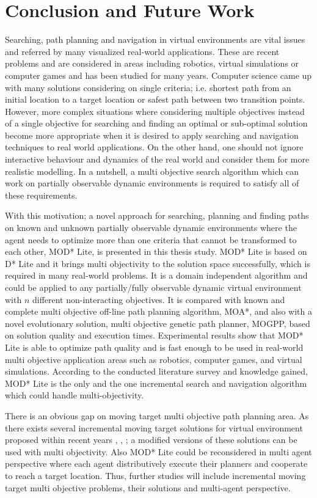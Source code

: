 \chapter{Conclusion and Future Work}
\label{chapter:conclusion}

Searching, path planning and navigation in virtual environments are vital issues and referred by many visualized real-world applications. These are recent problems and are considered in areas including robotics, virtual simulations or computer games and has been studied for many years. Computer science came up with many solutions considering on single criteria; i.e. shortest path from an initial location to a target location or safest path between two transition points. However, more complex situations where considering multiple objectives instead of a single objective for searching and finding an optimal or sub-optimal solution become more appropriate when it is desired to apply searching and navigation techniques to real world applications. On the other hand, one should not ignore interactive behaviour and dynamics of the real world and consider them for more realistic modelling. In a nutshell, a multi objective search algorithm which can work on partially observable dynamic environments is required to satisfy all of these requirements.

With this motivation; a novel approach for searching, planning and finding paths on known and unknown partially observable dynamic environments  where the agent needs to optimize more than one criteria that cannot be transformed to each other, MOD* Lite, is presented in this thesis study. MOD* Lite is based on D* Lite and it brings multi objectivity to the solution space successfully, which is required in many real-world problems. It is a domain independent algorithm and could be applied to any partially/fully observable dynamic virtual environment with $n$ different non-interacting objectives. It is compared with known and complete multi objective off-line path planning algorithm, MOA*, and also with a novel evolutionary solution, multi objective genetic path planner, MOGPP, based on solution quality and execution times. Experimental results show that MOD* Lite is able to optimize path quality and is fast enough to be used in real-world multi objective application areas such as robotics, computer games, and virtual simulations. According to the conducted literature survey and knowledge gained, MOD* Lite is the only and the one incremental search and navigation algorithm which could handle multi-objectivity.

There is an obvious gap on moving target multi objective path planning area. As there exists several incremental moving target solutions for virtual environment proposed within recent years \cite{Sun:2009}, \cite{GFR-A*Sun:2010}, \cite{MT-D*Lite:2010}; a modified versions of these solutions can be used with multi objectivity. Also MOD* Lite could be reconsidered in multi agent perspective where each agent distributively execute their planners and cooperate to reach a target location. Thus, further studies will include incremental moving target multi objective problems, their solutions and multi-agent perspective.